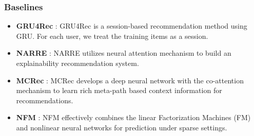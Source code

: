 \subsubsection{Baselines}
\begin{itemize}
	\item \textbf{GRU4Rec} \cite{hidasi2015session, hidasi2018recurrent}: GRU4Rec is a session-based recommendation method using GRU. For each user, we treat the training items as a session. %
	
	\item \textbf{NARRE} \cite{chen2018neural}: NARRE utilizes neural attention mechanism to build an explainability recommendation system. %
	
	\item \textbf{MCRec} \cite{hu2018leveraging}: MCRec develops a deep neural network with the co-attention mechanism to learn rich meta-path based context information for recommendations. %
	
	
	\item \textbf{NFM} \cite{he2017neural2}: NFM effectively combines the linear Factorization Machines (FM) and nonlinear neural networks for prediction under sparse settings. %
	
	
	

\end{itemize}
